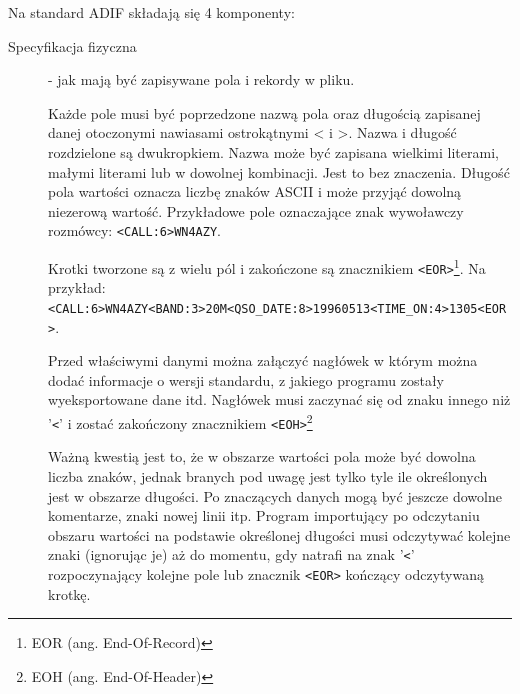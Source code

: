 \documentclass[]{mgr}
\begin{document}
            Na standard ADIF składają się 4 komponenty:
            \begin{description}
                \item[Specyfikacja fizyczna] - jak mają być zapisywane pola i rekordy w pliku.

                Każde pole musi być poprzedzone nazwą pola oraz długością zapisanej danej otoczonymi nawiasami ostrokątnymi < i >. Nazwa i długość rozdzielone są dwukropkiem. Nazwa może być zapisana wielkimi literami, małymi literami lub w dowolnej kombinacji. Jest to bez znaczenia. Długość pola wartości oznacza liczbę znaków ASCII i może przyjąć dowolną niezerową wartość. Przykładowe pole oznaczające znak wywoławczy rozmówcy: \texttt{<CALL:6>WN4AZY}. 

                Krotki tworzone są z wielu pól i zakończone są znacznikiem \texttt{<EOR>}\footnote{EOR (ang. End-Of-Record)}. Na przykład: \texttt{<CALL:6>WN4AZY<BAND:3>20M<QSO\_DATE:8>19960513<TIME\_ON:4>1305<EOR>}.

                Przed właściwymi danymi można załączyć nagłówek w którym można dodać informacje o wersji standardu, z jakiego programu zostały wyeksportowane dane itd. Nagłówek musi zaczynać się od znaku innego niż '\texttt{<}' i zostać zakończony znacznikiem \texttt{<EOH>}\footnote{EOH (ang. End-Of-Header)}

                Ważną kwestią jest to, że w obszarze wartości pola może być dowolna liczba znaków, jednak branych pod uwagę jest tylko tyle ile określonych jest w obszarze długości. Po znaczących danych mogą być jeszcze dowolne komentarze, znaki nowej linii itp. Program importujący po odczytaniu obszaru wartości na podstawie określonej długości musi odczytywać kolejne znaki (ignorując je) aż do momentu, gdy natrafi na znak '\texttt{<}' rozpoczynający kolejne pole lub znacznik \texttt{<EOR>} kończący odczytywaną krotkę.


\end{description}
\end{document}
